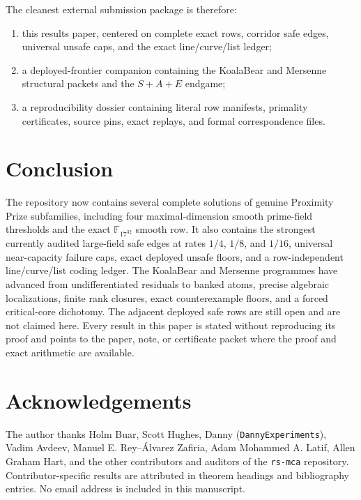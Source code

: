 \documentclass[11pt,a4paper]{amsart}
\numberwithin{equation}{section}
\theoremstyle{remark}
\begin{document}
The cleanest external submission package is therefore:
\begin{enumerate}[label=\textup{(\arabic*)},leftmargin=*]
\item this results paper, centered on complete exact rows, corridor safe edges, universal unsafe caps, and the exact line/curve/list ledger;
\item a deployed-frontier companion containing the KoalaBear and Mersenne structural packets and the $S{+}A{+}E$ endgame;
\item a reproducibility dossier containing literal row manifests, primality certificates, source pins, exact replays, and formal correspondence files.
\end{enumerate}

\section{Conclusion}

The repository now contains several complete solutions of genuine Proximity Prize subfamilies, including four maximal-dimension smooth prime-field thresholds and the exact $\mathbb F_{17^{32}}$ smooth row.  It also contains the strongest currently audited large-field safe edges at rates $1/4$, $1/8$, and $1/16$, universal near-capacity failure caps, exact deployed unsafe floors, and a row-independent line/curve/list coding ledger.  The KoalaBear and Mersenne programmes have advanced from undifferentiated residuals to banked atoms, precise algebraic localizations, finite rank closures, exact counterexample floors, and a forced critical-core dichotomy.  The adjacent deployed safe rows are still open and are not claimed here.  Every result in this paper is stated without reproducing its proof and points to the paper, note, or certificate packet where the proof and exact arithmetic are available.

\section*{Acknowledgements}
The author thanks Holm Buar, Scott Hughes, Danny (\texttt{DannyExperiments}), Vadim Avdeev, Manuel E. Rey--\'Alvarez Zafiria, Adam Mohammed A. Latif, Allen Graham Hart, and the other contributors and auditors of the \texttt{rs-mca} repository.  Contributor-specific results are attributed in theorem headings and bibliography entries.  No email address is included in this manuscript.
\end{document}
